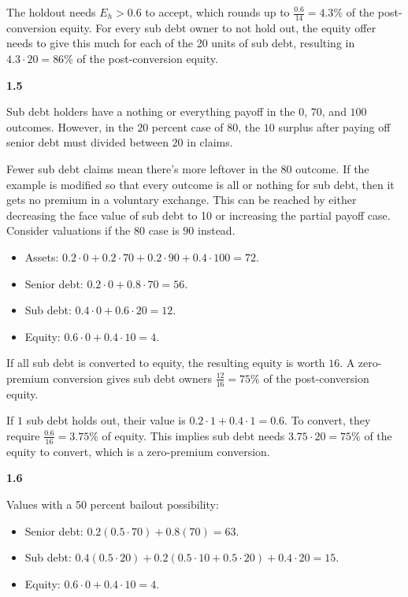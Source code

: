 \documentclass[11pt]{article}
\begin{document}
The holdout needs $E_{h} > 0.6$ to accept, which rounds up to $\frac{0.6}{14} = 4.3\%$ of the post-conversion equity. For every sub debt owner to not hold out, the equity offer needs to give this much for each of the 20 units of sub debt, resulting in $4.3 \cdot 20 = 86\%$ of the post-conversion equity.

\newpage

\textbf{1.5}

Sub debt holders have a nothing or everything payoff in the $0$, $70$, and $100$ outcomes. However, in the $20$ percent case of $80$, the $10$ surplus after paying off senior debt must divided between $20$ in claims. 

Fewer sub debt claims mean there's more leftover in the $80$ outcome. If the example is modified so that every outcome is all or nothing for sub debt, then it gets no premium in a voluntary exchange. This can be reached by either decreasing the face value of sub debt to 10 or increasing the partial payoff case. Consider valuations if the $80$ case is $90$ instead.

\begin{itemize}
  \item Assets: $0.2 \cdot 0 + 0.2 \cdot 70 + 0.2 \cdot 90 + 0.4 \cdot 100 = 72$.
  \item Senior debt: $0.2 \cdot 0 + 0.8 \cdot 70 = 56$. 
  \item Sub debt: $0.4 \cdot 0 + 0.6 \cdot 20 = 12$.
  \item Equity: $0.6 \cdot 0 + 0.4 \cdot 10 = 4$.
\end{itemize}


If all sub debt is converted to equity, the resulting equity is worth $16$. A zero-premium conversion gives sub debt owners $\frac{12}{16} = 75\%$ of the post-conversion equity. 

If $1$ sub debt holds out, their value is $0.2 \cdot 1 + 0.4 \cdot 1 = 0.6$. To convert, they require $\frac{0.6}{16} = 3.75\%$ of equity. This implies sub debt needs $3.75 \cdot 20 = 75\%$ of the equity to convert, which is a zero-premium conversion.

\textbf{1.6}

Values with a 50 percent bailout possibility: 

\begin{itemize}
  \item Senior debt: $0.2(0.5 \cdot 70) + 0.8(70) = 63$.
  \item Sub debt: $0.4(0.5 \cdot 20) + 0.2(0.5 \cdot 10 + 0.5 \cdot 20) + 0.4 \cdot 20 = 15$.
  \item Equity: $0.6 \cdot 0 + 0.4 \cdot 10 = 4$.
\end{itemize}
\end{document}
